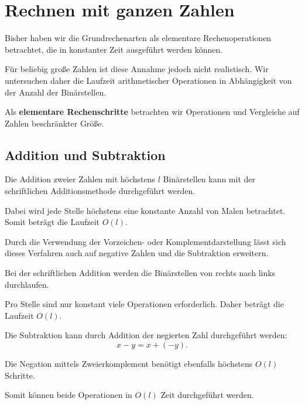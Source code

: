 
\chapter{Rechnen mit ganzen Zahlen}

Bisher haben wir die Grundrechenarten als elementare
Rechenoperationen betrachtet, die in konstanter Zeit
ausgeführt werden können.

Für beliebig große Zahlen ist diese Annahme jedoch
nicht realistisch. Wir untersuchen daher die Laufzeit
arithmetischer Operationen in Abhängigkeit von der
Anzahl der Binärstellen.

Als \textbf{elementare Rechenschritte} betrachten wir
Operationen und Vergleiche auf Zahlen beschränkter Größe.


\section{Addition und Subtraktion}

Die Addition zweier Zahlen mit höchstens $l$ Binärstellen
kann mit der schriftlichen Additionsmethode durchgeführt
werden.

Dabei wird jede Stelle höchstens eine konstante Anzahl
von Malen betrachtet. Somit beträgt die Laufzeit $O(l)$.

Durch die Verwendung der Vorzeichen- oder
Komplementdarstellung lässt sich dieses Verfahren
auch auf negative Zahlen und die Subtraktion erweitern.


\begin{myproof}
  Bei der schriftlichen Addition werden die
  Binärstellen von rechts nach links durchlaufen.

  Pro Stelle sind nur konstant viele Operationen
  erforderlich. Daher beträgt die Laufzeit $O(l)$.

  Die Subtraktion kann durch Addition der
  negierten Zahl durchgeführt werden:
  \[
    x-y=x+(-y).
  \]

  Die Negation mittels Zweierkomplement
  benötigt ebenfalls höchstens $O(l)$ Schritte.

  Somit können beide Operationen in
  $O(l)$ Zeit durchgeführt werden.
\end{myproof}


